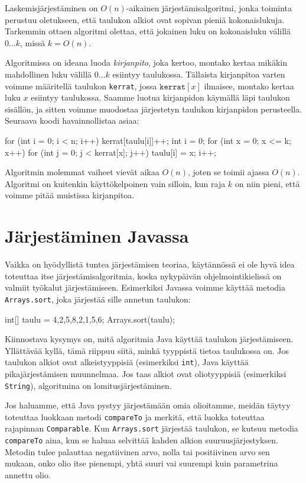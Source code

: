 Laskemisjärjestäminen on $O(n)$-aikainen järjestämisalgoritmi,
jonka toiminta perustuu oletukseen, että taulukon alkiot
ovat sopivan pieniä kokonaislukuja.
Tarkemmin ottaen algoritmi olettaa, että jokainen luku on
kokonaisluku välillä $0 \dots k$, missä $k=O(n)$.

Algoritmissa on ideana luoda \emph{kirjanpito}, joka kertoo,
montako kertaa mikäkin mahdollinen luku välillä $0 \dots k$
esiintyy taulukossa.
Tällaista kirjanpitoa varten voimme määritellä taulukon
\texttt{kerrat}, jossa $\texttt{kerrat}[x]$ ilmaisee,
montako kertaa luku $x$ esiintyy taulukossa.
Saamme luotua kirjanpidon käymällä läpi taulukon sisällön,
ja sitten voimme muodostaa järjestetyn taulukon
kirjanpidon perusteella.
Seuraava koodi havainnollistaa asiaa:

\begin{code}
for (int i = 0; i < n; i++) {
    kerrat[taulu[i]]++;
}
int i = 0;
for (int x = 0; x <= k; x++) {
    for (int j = 0; j < kerrat[x]; j++) {
        taulu[i] = x;
        i++;
    }
}
\end{code}

Algoritmin molemmat vaiheet vievät aikaa $O(n)$,
joten se toimii ajassa $O(n)$.
Algoritmi on kuitenkin käyttökelpoinen vain silloin,
kun raja $k$ on niin pieni, että voimme pitää
muistissa kirjanpitoa.

\section{Järjestäminen Javassa}

Vaikka on hyödyllistä tuntea järjestämisen teoriaa,
käytännössä ei ole hyvä idea toteuttaa itse
järjestämisalgoritmia, koska nykypäivän ohjelmointikielissä
on valmiit työkalut järjestämiseen.
Esimerkiksi Javassa voimme käyttää metodia \texttt{Arrays.sort},
joka järjestää sille annetun taulukon:

\begin{code}
int[] taulu = {4,2,5,8,2,1,5,6};
Arrays.sort(taulu);
\end{code}

Kiinnostava kysymys on, mitä algoritmia Java käyttää
taulukon järjes\-tämiseen.
Yllättävää kyllä, tämä riippuu siitä, minkä tyyppistä tietoa
taulukossa on.
Jos taulukon alkiot ovat alkeistyyppisiä
(esimerkiksi \texttt{int}), Java käyttää 
pikajärjestämisen muunnelmaa.
Jos taas alkiot ovat oliotyyppisiä
(esimerkiksi \texttt{String}),
algoritmina on lomitusjärjestäminen.

Jos haluamme, että Java pystyy järjestämään omia olioitamme,
meidän täytyy toteuttaa luokkaan metodi \texttt{compareTo} ja
merkitä, että luokka toteuttaa rajapinnan \texttt{Comparable}.
Kun \texttt{Arrays.sort} järjestää taulukon,
se kutsuu metodia \texttt{compareTo} aina, kun se haluaa selvittää
kahden alkion suuruusjärjestyksen.
Metodin tulee palauttaa negatiivinen arvo, nolla tai positiivinen arvo
sen mukaan, onko olio itse pienempi, yhtä suuri vai suurempi
kuin parametrina annettu olio.

